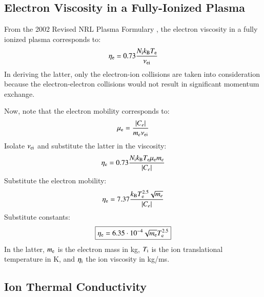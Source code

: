 \documentclass{warpdoc}
\newcommand\frameeqn[1]{\fbox{$\displaystyle #1$}}
\begin{document}
\subsection{Electron Viscosity in a Fully-Ionized Plasma}

From the 2002 Revised NRL Plasma Formulary \cite{nrl:2002:huba}, the electron viscosity in a fully ionized plasma corresponds to:
%
\begin{equation}
\eta_{\rm e}= 0.73    \frac{N_{\rm i} k_{\rm B} T_{\rm e} }{\nu_{\rm ei}}
\end{equation}
%
In deriving the latter, only the electron-ion collisions are taken into consideration because the electron-electron collisions would not result in significant momentum exchange.

Now, note that the electron mobility corresponds to:
%
\begin{equation}
 \mu_{\rm e} = \frac{|C_e|}{m_e \nu_{\rm ei}}
\end{equation}
%
Isolate $\nu_{\rm ei}$ and substitute the latter in the viscosity:
%
\begin{equation}
\eta_{\rm e}= 0.73    \frac{N_{\rm i} k_{\rm B} T_{\rm e}\mu_{\rm e} m_e }{|C_e|}
\end{equation}
%
Substitute the electron mobility:
%
\begin{equation}
\eta_{\rm e}= 7.37    \frac{ k_{\rm B} T_{\rm e}^{2.5}  \sqrt{m_e} }{|C_e|}
\end{equation}
%
Substitute constants:
%
\begin{equation}
\frameeqn{
\eta_{\rm e}=   6.35 \cdot 10^{-4}  \sqrt{m_{\rm e}}   T_{\rm e}^{2.5}  
}
\end{equation}
%
In the latter, $m_{\rm e}$ is the electron mass in kg, $T_{\rm i}$ is the ion translational temperature in K, and $\eta_{\rm i}$ the ion viscosity in kg/ms. 


\subsection{Ion Thermal Conductivity}
\end{document}
